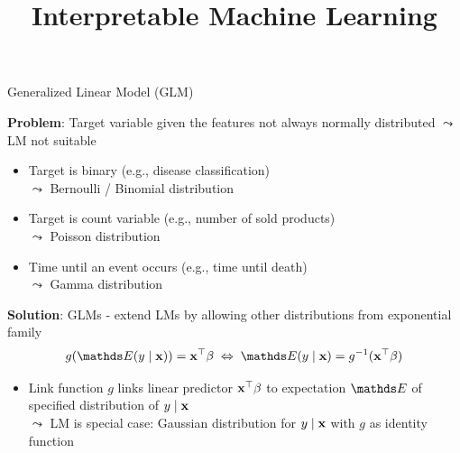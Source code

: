 \documentclass[11pt,compress,t,notes=noshow, aspectratio=169, xcolor=table]{beamer}
\title{Interpretable Machine Learning}
\date{}
\begin{document}
\newcommand{\titlefigure}{figure/whitebox}
\newcommand{\learninggoals}{
\item Definition of GLMs
\item Logistic regression as example
\item Interpretation in logistic regression
}



\begin{frame}{Generalized Linear Model (GLM) }

\textbf{Problem}: Target variable given the features not always normally distributed $\leadsto$ LM not suitable
\begin{itemize}
    \item Target is binary (e.g., disease classification)\\
    $\leadsto$ Bernoulli / Binomial distribution
    \item Target is count variable (e.g., number of sold products)\\
    $\leadsto$ Poisson distribution
    \item Time until an event occurs (e.g., time until death)\\
    $\leadsto$ Gamma distribution
\end{itemize}
\medskip
\pause
\textbf{Solution}: GLMs - extend LMs by allowing other distributions from exponential family
$$g(\E (y \mid \xv)) = \xv^\top \beta \; \Leftrightarrow \; \E (y \mid \xv) = g^{-1}(\xv^\top \beta)$$
\vspace*{-0.5cm}
    \begin{itemize}[<+->]
        \item Link function $g$ links linear predictor $\xv^\top \beta$ to expectation $\E$ of specified distribution of $y \mid \xv$\\
        $\leadsto$ LM is special case: Gaussian distribution for $y \mid \xv$ with $g$ as identity function 

\end{itemize}
\end{frame}
\end{document}
